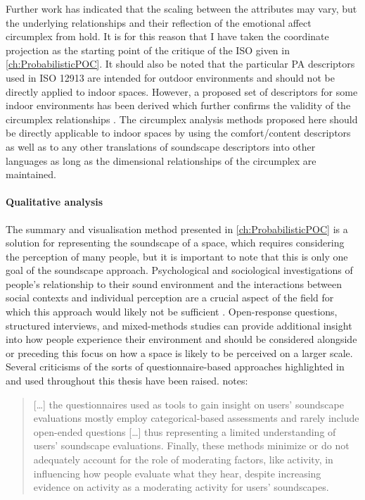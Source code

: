 Further work has indicated that the scaling between the attributes may vary, but the underlying relationships and their reflection of the emotional affect circumplex from \citet{Russell1980circumplex} hold. It is for this reason that I have taken the coordinate projection as the starting point of the critique of the ISO given in \cref{ch:ProbabilisticPOC}. It should also be noted that the particular PA descriptors used in ISO 12913 are intended for outdoor environments and should not be directly applied to indoor spaces. However, a proposed set of descriptors for some indoor environments has been derived which further confirms the validity of the circumplex relationships \citep{Torresin2020Indoor}. The circumplex analysis methods proposed here should be directly applicable to indoor spaces by using the comfort/content descriptors as well as to any other translations of soundscape descriptors into other languages \citep{Aletta2020Soundscape} as long as the dimensional relationships of the circumplex are maintained.

\paragraph*{Qualitative analysis}

The summary and visualisation method presented in \cref{ch:ProbabilisticPOC} is a solution for representing the soundscape of a space, which requires considering the perception of many people, but it is important to note that this is only one goal of the soundscape approach. Psychological and sociological investigations of people's relationship to their sound environment and the interactions between social contexts and individual perception are a crucial aspect of the field for which this approach would likely not be sufficient \citep{Bild2018Public}. Open-response questions, structured interviews, and mixed-methods studies can provide additional insight into how people experience their environment and should be considered alongside or preceding this focus on how a space is likely to be perceived on a larger scale. Several criticisms of the sorts of questionnaire-based approaches highlighted in \citet{ISO12913Part2} and used throughout this thesis have been raised. \citet{Bild2018Public} notes:

\begin{quote}
  [\dots] the questionnaires used as tools to gain insight on users' soundscape evaluations mostly employ categorical-based assessments and rarely include open-ended questions [\ldots] thus representing a limited understanding of users' soundscape evaluations. Finally, these methods minimize or do not adequately account for the role of moderating factors, like activity, in influencing how people evaluate what they hear, despite increasing evidence on activity as a moderating activity for users' soundscapes.
\end{quote}

